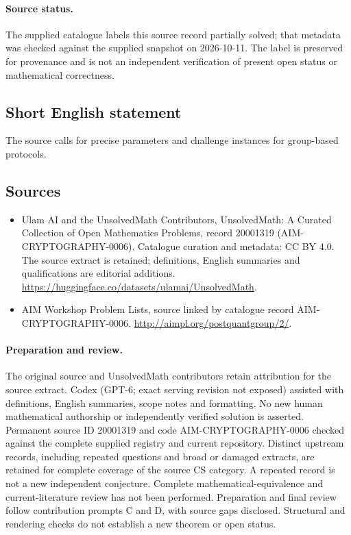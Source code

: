 \documentclass[11pt]{article}
\begin{document}
\paragraph{Source status.}
The supplied catalogue labels this source record partially solved; that metadata was checked against the supplied snapshot on 2026-10-11. The label is preserved for provenance and is not an independent verification of present open status or mathematical correctness.
\subsection{Short English statement}
The source calls for precise parameters and challenge instances for group-based protocols.
\subsection{Sources}
\begin{itemize}
\item[\hypertarget{source:20001319:1}{S1}] Ulam AI and the UnsolvedMath Contributors, UnsolvedMath: A Curated Collection of Open Mathematics Problems, record 20001319 (AIM-CRYPTOGRAPHY-0006). Catalogue curation and metadata: CC BY 4.0. The source extract is retained; definitions, English summaries and qualifications are editorial additions.
\url{https://huggingface.co/datasets/ulamai/UnsolvedMath}.
\item[\hypertarget{source:20001319:2}{S2}] AIM Workshop Problem Lists, source linked by catalogue record AIM-CRYPTOGRAPHY-0006.
\url{http://aimpl.org/postquantgroup/2/}.
\end{itemize}
\paragraph{Preparation and review.}
The original source and UnsolvedMath contributors retain attribution for the source extract. Codex (GPT-6; exact serving revision not exposed) assisted with definitions, English summaries, scope notes and formatting. No new human mathematical authorship or independently verified solution is asserted. Permanent source ID 20001319 and code AIM-CRYPTOGRAPHY-0006 checked against the complete supplied registry and current repository. Distinct upstream records, including repeated questions and broad or damaged extracts, are retained for complete coverage of the source CS category. A repeated record is not a new independent conjecture. Complete mathematical-equivalence and current-literature review has not been performed. Preparation and final review follow contribution prompts C and D, with source gaps disclosed. Structural and rendering checks do not establish a new theorem or open status.
\label{end:20001319}
\end{document}
